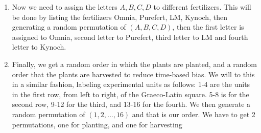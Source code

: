 \documentclass{article}
\begin{document}
\begin{enumerate}
\item Now we need to assign the letters $A,B,C,D$ to different fertilizers. This will be done by listing the fertilizers Omnia, Purefert, LM, Kynoch, then generating a random permutation of $(A,B,C,D)$, then the first letter is assigned to Omnia, second letter to Purefert, third letter to LM and fourth letter to Kynoch.

\item Finally, we get a random order in which the plants are planted, and a random order that the plants are harvested to reduce time-based bias. We will to this in a similar fashion, labeling experimental units as follows: 1-4 are the units in the first row, from left to right, of the Graeco-Latin square. 5-8 is for the second row, 9-12 for the third, and 13-16 for the fourth. We then generate a random permutation of $(1, 2, ..., 16)$ and that is our order. We have to get 2 permutations, one for planting, and one for harvesting
            
\end{enumerate}
\end{document}
